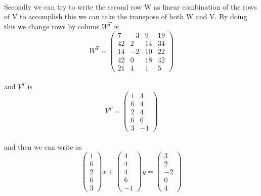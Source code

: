 \documentclass[11pt]{article}
\begin{document}
\paragraph{}Secondly we can try to write the second row W as linear combination of the rows of V to accomplish this we can take the transpose of both W and V. By doing this we change rows by colums
$W^T $ is 
\[
W^T=
\begin{pmatrix}
7& -3& 9& 19\\
42& 2& 14& 34\\
14& -2& 10& 22\\
42& 0& 18& 42\\
21& 4& 1& 5
\end{pmatrix}
\]
\paragraph{}and $V^T$ is
\[
V^T=
\begin{pmatrix}
1&4\\
6&4\\
2&4\\
6&6\\
3&-1
\end{pmatrix}
\]
\paragraph{}and then we can write as
\[
\begin{pmatrix}
1\\
6\\
2\\
6\\
3
\end{pmatrix}x
+
\begin{pmatrix}
4\\
4\\
4\\
6\\
-1
\end{pmatrix}y
=
\begin{pmatrix}
3\\
2\\
-2\\
0\\
4
\end{pmatrix}
\]
\end{document}
